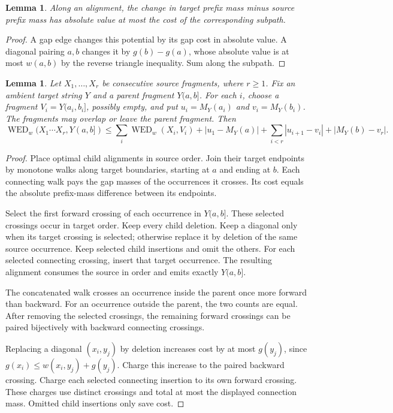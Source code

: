 \documentclass[11pt]{article}
\newtheorem{lemma}[theorem]{Lemma}
\theoremstyle{definition}
\newcommand{\WED}{\operatorname{WED}}
\newcommand{\1}{\mathbf 1}
\begin{document}
\begin{lemma}\label{seed:lem:potential}
Along an alignment, the change in target prefix mass minus source prefix
mass has absolute value at most the cost of the corresponding subpath.
\end{lemma}
\begin{proof}
A gap edge changes this potential by its gap cost in absolute value. A
diagonal pairing $a,b$ changes it by $g(b)-g(a)$, whose absolute value is
at most $w(a,b)$ by the reverse triangle inequality. Sum along the subpath.
\end{proof}

\begin{lemma}\label{seed:lem:connection}
Let $X_1,\dots,X_r$ be consecutive source fragments, where $r\ge1$.
Fix an ambient target string $Y$ and a parent fragment $Y(a,b]$.
For each $i$, choose a fragment $V_i=Y(a_i,b_i]$, possibly empty,
and put $u_i=M_Y(a_i)$ and $v_i=M_Y(b_i)$.
The fragments may overlap or leave the parent fragment.
Then
\[
 \WED_w(X_1\cdots X_r,Y(a,b])
 \le \sum_i\WED_w(X_i,V_i)
       +|u_1-M_Y(a)|+\sum_{i<r}|u_{i+1}-v_i|
       +|M_Y(b)-v_r|.
\]
\end{lemma}
\begin{proof}
Place optimal child alignments in source order.
Join their target endpoints by monotone walks along target boundaries,
starting at $a$ and ending at $b$.
Each connecting walk pays the gap masses of the occurrences it crosses.
Its cost equals the absolute prefix-mass difference between its endpoints.

Select the first forward crossing of each occurrence in $Y(a,b]$.
These selected crossings occur in target order.
Keep every child deletion.
Keep a diagonal only when its target crossing is selected; otherwise
replace it by deletion of the same source occurrence.
Keep selected child insertions and omit the others.
For each selected connecting crossing, insert that target occurrence.
The resulting alignment consumes the source in order and emits exactly
$Y(a,b]$.

The concatenated walk crosses an occurrence inside the parent once
more forward than backward. For an occurrence outside the parent,
the two counts are equal.
After removing the selected crossings, the remaining forward crossings
can be paired bijectively with backward connecting crossings.

Replacing a diagonal $(x_i,y_j)$ by deletion increases cost by at most
$g(y_j)$, since $g(x_i)\le w(x_i,y_j)+g(y_j)$.
Charge this increase to the paired backward crossing.
Charge each selected connecting insertion to its own forward crossing.
These charges use distinct crossings and total at most the displayed
connection mass. Omitted child insertions only save cost.
\end{proof}
\end{document}
